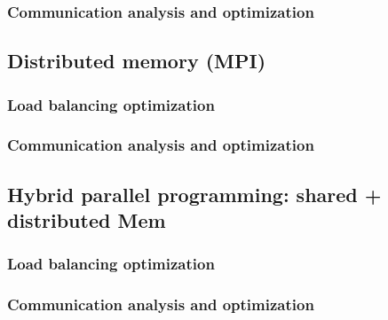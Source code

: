 \documentclass[10pt,xcolor=table]{beamer}
\begin{document}
\frame{
}

\subsubsection{Communication analysis and optimization}

\frame{
}

\subsection{Distributed memory (MPI)}

\frame{
}

\subsubsection{Load balancing optimization}

\frame{
}

\subsubsection{Communication analysis and optimization}

\frame{
}

\subsection{Hybrid parallel programming: shared + distributed Mem}

\frame{
}

\subsubsection{Load balancing optimization}

\frame{
}

\subsubsection{Communication analysis and optimization}

\frame{
}
\end{document}
